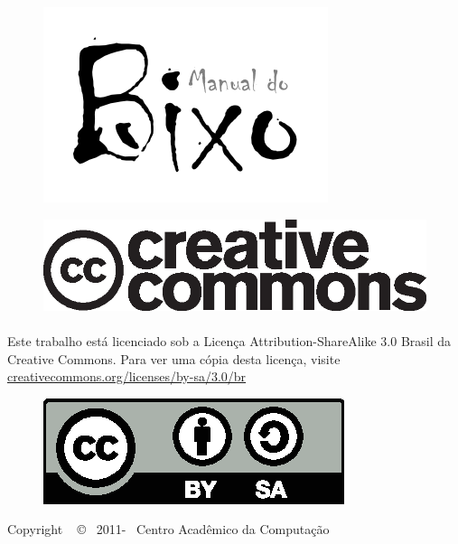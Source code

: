 \documentclass[a4paper,10pt]{book}
\begin{document}
\frontmatter
\begin{figure}[H]
    \vskip 50pt %
    \centering
    \includegraphics[width=.85\textwidth]{img/manual-logo.pdf}
\end{figure}

\vfill %

\begin{figure}[H]
    \centering
    \includegraphics[width=.5\textwidth]{img/cc-logo.eps}
\end{figure}

\paragraph{}
Este trabalho está licenciado sob a Licença Attribution-ShareAlike 3.0 Brasil da
Creative Commons. Para ver uma cópia desta licença, visite
\url{creativecommons.org/licenses/by-sa/3.0/br}

\begin{figure}[H]
    \centering
    \includegraphics[scale=.8]{img/by-sa.eps}
\end{figure}

\begin{center}
    Copyright ~ \copyright ~ 2011-\the\year ~ Centro Acadêmico da Computação
\end{center}
\end{document}
